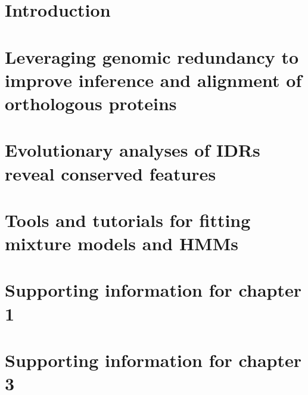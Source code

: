 \documentclass[11pt,letterpaper,oneside]{book}
\newlength{\promptwidth}
\begin{document}
\tableofcontents
\newpage  %
\setcounter{chapter}{-1}  %
\setcounter{page}{1}  %

\chapter{Introduction}
\graphicspath{{chapter0/figures/}}


\chapter{Leveraging genomic redundancy to improve inference and alignment of orthologous proteins}
\graphicspath{{chapter1/figures/}}


\chapter{Evolutionary analyses of IDRs reveal conserved features}


\chapter{Tools and tutorials for fitting mixture models and HMMs}
\graphicspath{{chapter3/}}



\printbibliography[heading=bibintoc]

\appendix
\setcounter{figure}{0}
\renewcommand{\thefigure}{\thechapter\arabic{figure}}
\setcounter{table}{0}
\renewcommand{\thetable}{\thechapter\arabic{table}}

\chapter{Supporting information for chapter 1}
\label{appendix:a}
\graphicspath{{chapter1/figures/}}


\chapter{Supporting information for chapter 3}
\label{appendix:b}
\setlength{\promptwidth}{0in}  %

\end{document}
